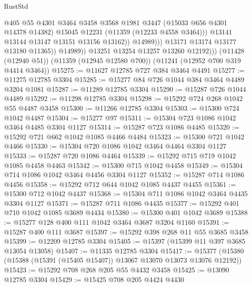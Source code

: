 \begin{lexlean}{RustStd}
\begin{coremodule}
{{{{{{{{{{{{{{{{{{{                              @405
                              @55
                              @4301
                              @3464
                              @3458
                              @3568
                              @1981
                              @3447
                              (@15033 @656 @4301 @14378 @14382)
                              @15045
                              @12231
                              (@11359 (@12233 @4558 @3464)))
                            @13141
                            @13144
                            @13147
                            @13151
                            @13156
                            @13162))
                        @14989)))
                  @13171
                  @13174
                  @13177
                  @13180
                  @11365))
              @14989))
          @13251
          @13254
          @13257
          @13260
          @12192)))
    (@11428 (@12940 @51))
    (@11359 (@12945 @12580 @700))
    (@11241 (@12952 @700 @319 @4414 @3464))
@15275 := @11627 @12785 @727 @384 @3464 @4491
@15277 := @11275 @12785 @3304
@15285 := @15277 @84 @726 @1044 @384 @3464 @4489 @3204 @1081
@15287 := @11289 @12785 @3304
@15290 := @15287 @726 @1044 @4489
@15292 := @11298 @12785 @3304
@15298 := @15292 @724 @268 @1042 @55 @4487 @3458
@15300 := @11266 @12785 @3304
@15303 := @15300 @724 @1042 @4487
@15304 := @15277 @97
@15311 := @15304 @723 @1086 @1042 @3464 @4485 @3304 @1127
@15314 := @15287 @723 @1086 @4485
@15320 := @15292 @721 @662 @1042 @1085 @4466 @4484
@15323 := @15300 @721 @1042 @4466
@15330 := @15304 @720 @1086 @1042 @3464 @4464 @3304 @1127
@15333 := @15287 @720 @1086 @4464
@15339 := @15292 @715 @719 @1042 @1085 @4458 @4463
@15342 := @15300 @715 @1042 @4458
@15349 := @15304 @714 @1086 @1042 @3464 @4456 @3304 @1127
@15352 := @15287 @714 @1086 @4456
@15358 := @15292 @712 @644 @1042 @1085 @4437 @4455
@15361 := @15300 @712 @1042 @4437
@15368 := @15304 @711 @1086 @1042 @3464 @4435 @3304 @1127
@15371 := @15287 @711 @1086 @4435
@15377 := @15292 @401 @710 @1042 @1085 @3689 @4434
@15380 := @15300 @401 @1042 @3689
@15388 := @15277 @128 @400 @111 @1042 @3464 @3687 @3204 @1160
@15391 := @15287 @400 @111 @3687
@15397 := @15292 @398 @268 @11 @55 @3685 @3458
@15399 := @12209 @12785 @3304
@15405 := @15397 (@15399 @11 @397 @3685 @13054 @13058)
@15407 := @11335 @12785 @3304
@15417 := @15377 (@15380 (@15388 (@15391 (@15405 @15407)) @13067 @13070 @13073 @13076 @12192))
@15423 := @15292 @708 @268 @205 @55 @4432 @3458
@15425 := @13090 @12785 @3304
@15429 := @15425 @708 @205 @4424 @4430
}}}}}}}}}}}}}}}}}}}
\end{coremodule}
\end{lexlean}
